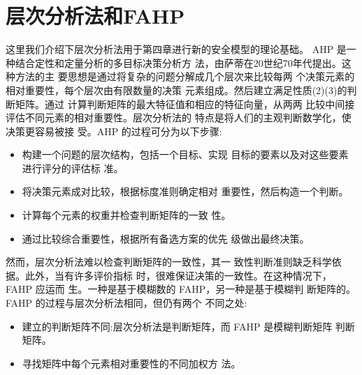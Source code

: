   \section{层次分析法和FAHP}
  这里我们介绍下层次分析法用于第四章进行新的安全模型的理论基础。
  AHP 是一种结合定性和定量分析的多目标决策分析方
法，由萨蒂在20世纪70年代提出\cite{saaty1990make}。这种方法的主
要思想是通过将复杂的问题分解成几个层次来比较每两
个决策元素的相对重要性，每个层次由有限数量的决策
元素组成。然后建立满足性质(2)(3)的判断矩阵。通过
计算判断矩阵的最大特征值和相应的特征向量，从两两
比较中间接评估不同元素的相对重要性。层次分析法的
特点是将人们的主观判断数学化，使决策更容易被接
受。AHP 的过程可分为以下步骤:
\begin{itemize}
  \item  构建一个问题的层次结构，包括一个目标、实现
  目标的要素以及对这些要素进行评分的评估标
  准。
  \item  将决策元素成对比较，根据标度准则确定相对
  重要性，然后构造一个判断。
  \item  计算每个元素的权重并检查判断矩阵的一致
  性。
  \item 通过比较综合重要性，根据所有备选方案的优先
  级做出最终决策。
\end{itemize}

然而，层次分析法难以检查判断矩阵的一致性，其一
致性判断准则缺乏科学依据。此外，当有许多评价指标
时，很难保证决策的一致性。在这种情况下，FAHP 应运而
生\cite{min1997fuzzy}。一种是基于模糊数的 FAHP，另一种是基于模糊判
断矩阵的。FAHP 的过程与层次分析法相同，但仍有两个
不同之处:
\begin{itemize}
  \item  建立的判断矩阵不同:层次分析法是判断矩阵，而
  FAHP 是模糊判断矩阵
  判断矩阵。
  \item  寻找矩阵中每个元素相对重要性的不同加权方
  法。
\end{itemize}